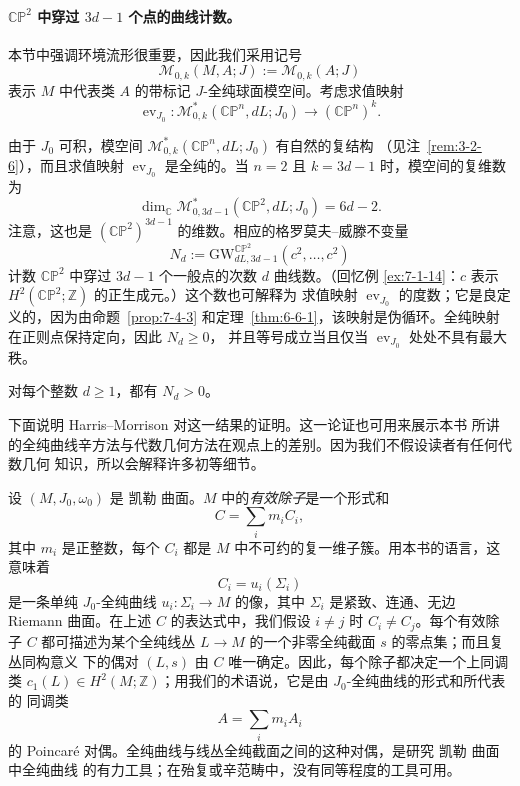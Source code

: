 \paragraph{$\mathbb{CP}^2$ 中穿过 $3d-1$ 个点的曲线计数。}
本节中强调环境流形很重要，因此我们采用记号
\[
  \mathcal M_{0,k}(M,A;J):=\mathcal M_{0,k}(A;J)
\]
表示 $M$ 中代表类 $A$ 的带标记 $J$-全纯球面模空间。考虑求值映射
\[
  \operatorname{ev}_{J_0}:
  \mathcal M^*_{0,k}(\mathbb{CP}^n,dL;J_0)
  \longrightarrow(\mathbb{CP}^n)^k.
\]

由于 $J_0$ 可积，模空间 $\mathcal M^*_{0,k}(\mathbb{CP}^n,dL;J_0)$ 有自然的复结构
（见注~\ref{rem:3-2-6}），而且求值映射 $\operatorname{ev}_{J_0}$ 是全纯的。当 $n=2$ 且
$k=3d-1$ 时，模空间的复维数为
\[
  \dim_{\mathbb C}\mathcal M^*_{0,3d-1}(\mathbb{CP}^2,dL;J_0)=6d-2.
\]
注意，这也是 $(\mathbb{CP}^2)^{3d-1}$ 的维数。相应的格罗莫夫--威滕不变量
\[
  N_d:=\mathrm{GW}^{\mathbb{CP}^2}_{dL,3d-1}
  (c^2,\ldots,c^2)
\]
计数 $\mathbb{CP}^2$ 中穿过 $3d-1$ 个一般点的次数 $d$ 曲线数。（回忆例
\ref{ex:7-1-14}：$c$ 表示 $H^2(\mathbb{CP}^2;\mathbb Z)$ 的正生成元。）这个数也可解释为
求值映射 $\operatorname{ev}_{J_0}$ 的度数；它是良定义的，因为由命题~\ref{prop:7-4-3}
和定理~\ref{thm:6-6-1}，该映射是伪循环。全纯映射在正则点保持定向，因此 $N_d\ge0$，
并且等号成立当且仅当 $\operatorname{ev}_{J_0}$ 处处不具有最大秩。

\begin{proposition}\label{prop:7-4-8}
对每个整数 $d\ge1$，都有 $N_d>0$。
\end{proposition}

下面说明 Harris--Morrison  对这一结果的证明。这一论证也可用来展示本书
所讲的全纯曲线辛方法与代数几何方法在观点上的差别。因为我们不假设读者有任何代数几何
知识，所以会解释许多初等细节。

设 $(M,J_0,\omega_0)$ 是 凯勒 曲面。$M$ 中的\emph{有效除子}是一个形式和
\[
  C=\sum_i m_iC_i,
\]
其中 $m_i$ 是正整数，每个 $C_i$ 都是 $M$ 中不可约的复一维子簇。用本书的语言，这意味着
\[
  C_i=u_i(\Sigma_i)
\]
是一条单纯 $J_0$-全纯曲线 $u_i:\Sigma_i\to M$ 的像，其中 $\Sigma_i$ 是紧致、连通、无边
Riemann 曲面。在上述 $C$ 的表达式中，我们假设 $i\ne j$ 时 $C_i\ne C_j$。每个有效除子
$C$ 都可描述为某个全纯线丛 $L\to M$ 的一个非零全纯截面 $s$ 的零点集；而且复丛同构意义
下的偶对 $(L,s)$ 由 $C$ 唯一确定。因此，每个除子都决定一个上同调类
$c_1(L)\in H^2(M;\mathbb Z)$；用我们的术语说，它是由 $J_0$-全纯曲线的形式和所代表的
同调类
\[
  A=\sum_i m_iA_i
\]
的 Poincaré 对偶。全纯曲线与线丛全纯截面之间的这种对偶，是研究 凯勒 曲面中全纯曲线
的有力工具；在殆复或辛范畴中，没有同等程度的工具可用。

